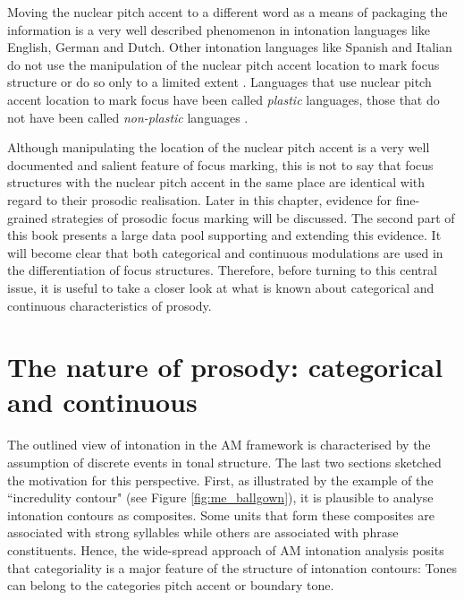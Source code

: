 Moving the nuclear pitch accent to a different word as a means of packaging the information is a very well described phenomenon in intonation languages like English, German and Dutch. Other intonation languages like Spanish and Italian do not use the manipulation of the nuclear pitch accent location to mark focus structure or do so only to a limited extent \citep{Ladd2008}. Languages that use nuclear pitch accent location to mark focus have been called \emph{plastic} languages, those that do not have been called \emph{non-plastic} languages \citep{Vallduvi1991}.

Although manipulating the location of the nuclear pitch accent is a very well documented and salient feature of focus marking, this is not to say that focus structures with the nuclear pitch accent in the same place are identical with regard to their prosodic realisation. Later in this chapter, evidence for fine-grained strategies of prosodic focus marking will be discussed. The second part of this book presents a large data pool supporting and extending this evidence. It will become clear that both categorical and continuous modulations are used in the differentiation of focus structures. Therefore, before turning to this central issue, it is useful to take a closer look at what is known about categorical and continuous characteristics of prosody. 

\section{The nature of prosody: categorical and continuous}
\label{sec:prosody_catcont}

The outlined view of intonation in the AM framework is characterised by the assumption of discrete events in tonal structure. The last two sections sketched the motivation for this perspective. First, as illustrated by the example of the ``incredulity contour" (see Figure \ref{fig:me_ballgown}), it is plausible to analyse intonation contours as composites. Some units that form these composites are associated with strong syllables while others are associated with phrase constituents. Hence, the wide-spread approach of AM intonation analysis posits that categoriality is a major feature of the structure of intonation contours: Tones can belong to the categories pitch accent or boundary tone. 

